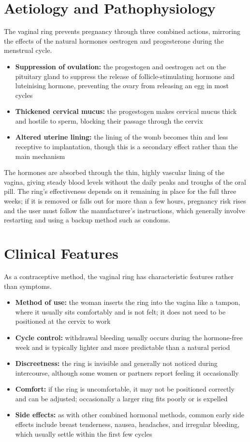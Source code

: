 \section*{Aetiology and Pathophysiology}
The vaginal ring prevents pregnancy through three combined actions, mirroring the effects of the natural hormones oestrogen and progesterone during the menstrual cycle.

\begin{itemize}
    \item \textbf{Suppression of ovulation:} the progestogen and oestrogen act on the pituitary gland to suppress the release of follicle-stimulating hormone and luteinising hormone, preventing the ovary from releasing an egg in most cycles
    \item \textbf{Thickened cervical mucus:} the progestogen makes cervical mucus thick and hostile to sperm, blocking their passage through the cervix
    \item \textbf{Altered uterine lining:} the lining of the womb becomes thin and less receptive to implantation, though this is a secondary effect rather than the main mechanism
\end{itemize}

The hormones are absorbed through the thin, highly vascular lining of the vagina, giving steady blood levels without the daily peaks and troughs of the oral pill. The ring's effectiveness depends on it remaining in place for the full three weeks; if it is removed or falls out for more than a few hours, pregnancy risk rises and the user must follow the manufacturer's instructions, which generally involve restarting and using a backup method such as condoms.

\section*{Clinical Features}
As a contraceptive method, the vaginal ring has characteristic features rather than symptoms.

\begin{itemize}
    \item \textbf{Method of use:} the woman inserts the ring into the vagina like a tampon, where it usually sits comfortably and is not felt; it does not need to be positioned at the cervix to work
    \item \textbf{Cycle control:} withdrawal bleeding usually occurs during the hormone-free week and is typically lighter and more predictable than a natural period
    \item \textbf{Discreetness:} the ring is invisible and generally not noticed during intercourse, although some women or partners report feeling it occasionally
    \item \textbf{Comfort:} if the ring is uncomfortable, it may not be positioned correctly and can be adjusted; occasionally a larger ring fits poorly or is expelled
    \item \textbf{Side effects:} as with other combined hormonal methods, common early side effects include breast tenderness, nausea, headaches, and irregular bleeding, which usually settle within the first few cycles
\end{itemize}

